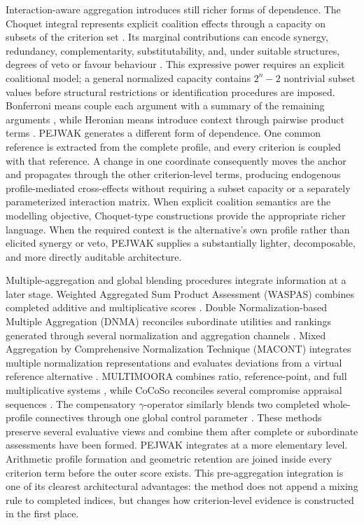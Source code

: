 \documentclass[reqno,11pt]{amsart}
\theoremstyle{definition}
\theoremstyle{plain}
\theoremstyle{remark}
\begin{document}
Interaction-aware aggregation introduces still richer forms of
dependence. The Choquet integral represents explicit coalition effects
through a capacity on subsets of the criterion set
\cite{Grabisch1996}. Its marginal contributions can encode synergy,
redundancy, complementarity, substitutability, and, under suitable
structures, degrees of veto or favour behaviour
\cite{Marichal2004}. This expressive power requires an explicit
coalitional model; a general normalized capacity contains
$2^n-2$ nontrivial subset values before structural restrictions or
identification procedures are imposed. Bonferroni means couple each
argument with a summary of the remaining arguments
\cite{Bonferroni1950,Yager2009,Beliakov2010}, while Heronian means
introduce context through pairwise product terms \cite{Guan2006}.
PEJWAK generates a different form of dependence. One common reference is
extracted from the complete profile, and every criterion is coupled with
that reference. A change in one coordinate consequently moves the anchor
and propagates through the other criterion-level terms, producing
endogenous profile-mediated cross-effects without requiring a subset
capacity or a separately parameterized interaction matrix. When explicit
coalition semantics are the modelling objective, Choquet-type
constructions provide the appropriate richer language. When the required
context is the alternative's own profile rather than elicited synergy or
veto, PEJWAK supplies a substantially lighter, decomposable, and more
directly auditable architecture.

Multiple-aggregation and global blending procedures integrate information
at a later stage. Weighted Aggregated Sum Product Assessment (WASPAS)
combines completed additive and multiplicative scores
\cite{Zavadskas2012}. Double Normalization-based Multiple Aggregation
(DNMA) reconciles subordinate utilities and rankings generated through
several normalization and aggregation channels \cite{Liao2020}.
Mixed Aggregation by Comprehensive Normalization Technique (MACONT)
integrates multiple normalization representations and evaluates
deviations from a virtual reference alternative \cite{Wen2020}.
MULTIMOORA combines ratio, reference-point, and full multiplicative
systems \cite{Brauers2010}, while CoCoSo reconciles several compromise
appraisal sequences \cite{Yazdani2019}. The compensatory
$\gamma$-operator similarly blends two completed whole-profile
connectives through one global control parameter
\cite{Zimmermann1980}. These methods preserve several evaluative views
and combine them after complete or subordinate assessments have been
formed. PEJWAK integrates at a more elementary level. Arithmetic profile
formation and geometric retention are joined inside every criterion term
before the outer score exists. This pre-aggregation integration is one of
its clearest architectural advantages: the method does not append a
mixing rule to completed indices, but changes how criterion-level
evidence is constructed in the first place.
\end{document}
